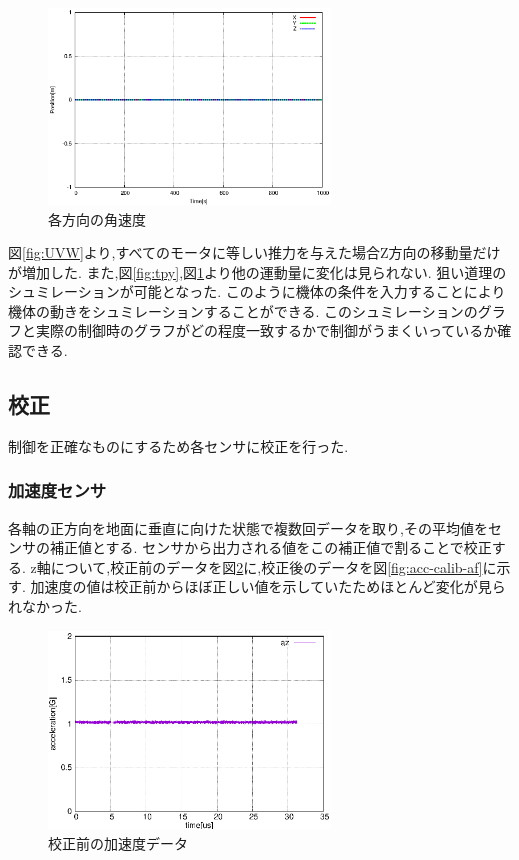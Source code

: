 \documentclass[12pt,oneside]{sotsuken_paper}
\begin{document}
\begin{figure}[htbp]
	\begin{center}
		\includegraphics[width=75mm]{image/XYZ.eps}
		\caption{各方向の角速度}
		\label{fig:XYZ}
	\end{center}
\end{figure}

図\ref{fig:UVW}より,すべてのモータに等しい推力を与えた場合Z方向の移動量だけが増加した.
また,図\ref{fig:tpy},図\ref{fig:XYZ}より他の運動量に変化は見られない.
狙い道理のシュミレーションが可能となった.
このように機体の条件を入力することにより機体の動きをシュミレーションすることができる.
このシュミレーションのグラフと実際の制御時のグラフがどの程度一致するかで制御がうまくいっているか確認できる.

\subsection{校正}
制御を正確なものにするため各センサに校正を行った.

\subsubsection{加速度センサ}
各軸の正方向を地面に垂直に向けた状態で複数回データを取り,その平均値をセンサの補正値とする.
センサから出力される値をこの補正値で割ることで校正する.
z軸について,校正前のデータを図\ref{fig:acc-calib-be}に,校正後のデータを図\ref{fig:acc-calib-af}に示す.
加速度の値は校正前からほぼ正しい値を示していたためほとんど変化が見られなかった.

\begin{figure}[htbp]
	\begin{center}
		\includegraphics[width=75mm]{image/calibration/acc-calib-be.eps}
		\caption{校正前の加速度データ}
		\label{fig:acc-calib-be}
	\end{center}
\end{figure}
\end{document}
